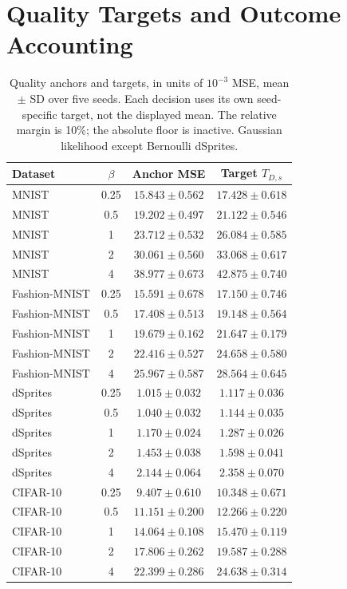 \documentclass[make,article,submit,pdftex,moreauthors]{Definitions/mdpi}
\begin{document}
\section{Quality Targets and Outcome Accounting}\label{app:targets}
\begin{table}[H]
\caption{Quality anchors and targets, in units of $10^{-3}$ MSE, mean $\pm$ SD over five seeds. Each decision uses its own seed-specific target, not the displayed mean. The relative margin is 10\%; the absolute floor is inactive. Gaussian likelihood except Bernoulli dSprites.}\label{tab:anchors}
\small
\setlength{\tabcolsep}{3.5pt}
\begin{tabular*}{\textwidth}{@{\extracolsep{\fill}}lccc@{}}
\toprule
Dataset & $\beta$ & Anchor MSE & Target $T_{D,s}$ \\
\midrule
MNIST & 0.25 & $15.843 \pm 0.562$ & $17.428 \pm 0.618$ \\
MNIST & 0.5 & $19.202 \pm 0.497$ & $21.122 \pm 0.546$ \\
MNIST & 1 & $23.712 \pm 0.532$ & $26.084 \pm 0.585$ \\
MNIST & 2 & $30.061 \pm 0.560$ & $33.068 \pm 0.617$ \\
MNIST & 4 & $38.977 \pm 0.673$ & $42.875 \pm 0.740$ \\
Fashion-MNIST & 0.25 & $15.591 \pm 0.678$ & $17.150 \pm 0.746$ \\
Fashion-MNIST & 0.5 & $17.408 \pm 0.513$ & $19.148 \pm 0.564$ \\
Fashion-MNIST & 1 & $19.679 \pm 0.162$ & $21.647 \pm 0.179$ \\
Fashion-MNIST & 2 & $22.416 \pm 0.527$ & $24.658 \pm 0.580$ \\
Fashion-MNIST & 4 & $25.967 \pm 0.587$ & $28.564 \pm 0.645$ \\
dSprites & 0.25 & $1.015 \pm 0.032$ & $1.117 \pm 0.036$ \\
dSprites & 0.5 & $1.040 \pm 0.032$ & $1.144 \pm 0.035$ \\
dSprites & 1 & $1.170 \pm 0.024$ & $1.287 \pm 0.026$ \\
dSprites & 2 & $1.453 \pm 0.038$ & $1.598 \pm 0.041$ \\
dSprites & 4 & $2.144 \pm 0.064$ & $2.358 \pm 0.070$ \\
CIFAR-10 & 0.25 & $9.407 \pm 0.610$ & $10.348 \pm 0.671$ \\
CIFAR-10 & 0.5 & $11.151 \pm 0.200$ & $12.266 \pm 0.220$ \\
CIFAR-10 & 1 & $14.064 \pm 0.108$ & $15.470 \pm 0.119$ \\
CIFAR-10 & 2 & $17.806 \pm 0.262$ & $19.587 \pm 0.288$ \\
CIFAR-10 & 4 & $22.399 \pm 0.286$ & $24.638 \pm 0.314$ \\
\bottomrule
\end{tabular*}
\end{table}
\end{document}
